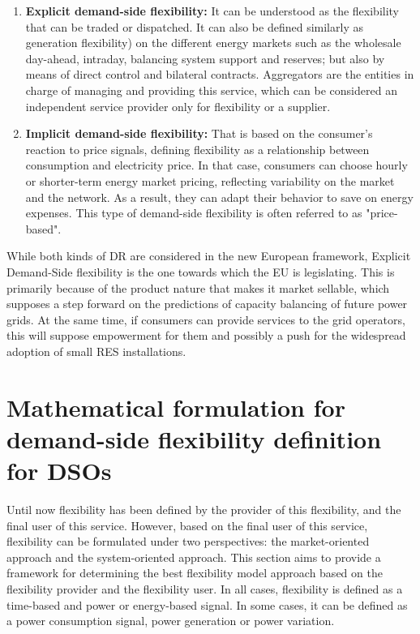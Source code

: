 \begin{enumerate}
\item \textbf{Explicit demand-side flexibility:} It can be understood as the flexibility that can be traded or dispatched. It can also be defined similarly as generation flexibility) on the different energy markets such as the wholesale day-ahead, intraday, balancing system support and reserves; but also by means of direct control and bilateral contracts. Aggregators are the entities in charge of managing and providing this service, which can be considered an independent service provider only for flexibility or a supplier.
\item \textbf{Implicit demand-side flexibility:} That is based on the consumer's reaction to price signals, defining flexibility as a relationship between consumption and electricity price. In that case, consumers can choose hourly or shorter-term energy market pricing, reflecting variability on the market and the network. As a result, they can adapt their behavior to save on energy expenses. This type of demand-side flexibility is often referred to as "price-based".
\end{enumerate}

While both kinds of DR are considered in the new European framework, Explicit Demand-Side flexibility is the one towards which the EU is legislating. This is primarily because of the product nature that makes it market sellable, which supposes a step forward on the predictions of capacity balancing of future power grids. At the same time, if consumers can provide services to the grid operators, this will suppose empowerment for them and possibly a push for the widespread adoption of small RES installations. 

\section{Mathematical formulation for demand-side flexibility definition for DSOs}

Until now flexibility has been defined by the provider of this flexibility, and the final user of this service. However, based on the final user of this service, flexibility can be formulated under two perspectives: the market-oriented approach and the system-oriented approach. This section aims to provide a framework for determining the best flexibility model approach based on the flexibility provider and the flexibility user. In all cases, flexibility is defined as a time-based and power or energy-based signal. In some cases, it can be defined as a power consumption signal, power generation or power variation. 

